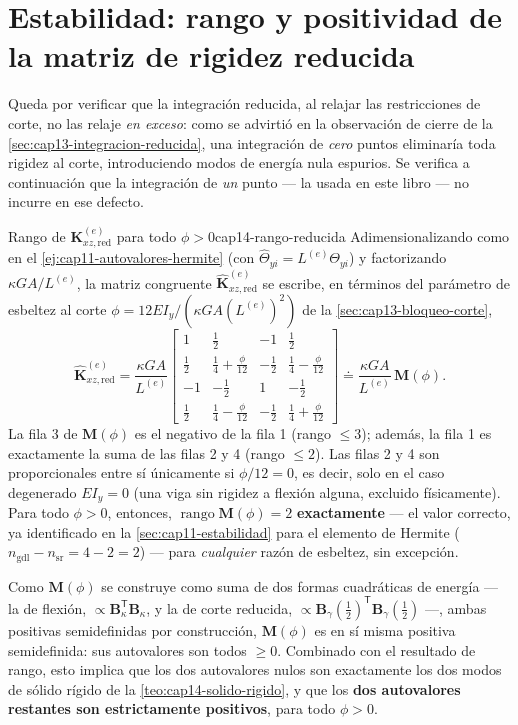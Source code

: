 \section{Estabilidad: rango y positividad de la matriz de rigidez reducida}
\label{sec:cap14-estabilidad}

Queda por verificar que la integración reducida, al relajar las restricciones de corte, no las relaje \emph{en exceso}: como se advirtió en la observación de cierre de la \cref{sec:cap13-integracion-reducida}, una integración de \emph{cero} puntos eliminaría toda rigidez al corte, introduciendo modos de energía nula espurios. Se verifica a continuación que la integración de \emph{un} punto --- la usada en este libro --- no incurre en ese defecto.

\begin{ejemplo}{Rango de \texorpdfstring{$\bm K^{(e)}_{xz,\text{red}}$}{K\_xz,red} para todo \texorpdfstring{$\phi>0$}{phi>0}}{cap14-rango-reducida}
Adimensionalizando como en el \cref{ej:cap11-autovalores-hermite} (con $\hat\Theta_{yi}=L^{(e)}\Theta_{yi}$) y factorizando $\kappa GA/L^{(e)}$, la matriz congruente $\hat{\bm K}^{(e)}_{xz,\text{red}}$ se escribe, en términos del parámetro de esbeltez al corte $\phi=12EI_y/(\kappa GA(L^{(e)})^2)$ de la \cref{sec:cap13-bloqueo-corte},
\[
\hat{\bm K}^{(e)}_{xz,\text{red}} = \frac{\kappa GA}{L^{(e)}}
\begin{bmatrix}
1 & \tfrac12 & -1 & \tfrac12 \\
\tfrac12 & \tfrac14+\tfrac{\phi}{12} & -\tfrac12 & \tfrac14-\tfrac{\phi}{12} \\
-1 & -\tfrac12 & 1 & -\tfrac12 \\
\tfrac12 & \tfrac14-\tfrac{\phi}{12} & -\tfrac12 & \tfrac14+\tfrac{\phi}{12}
\end{bmatrix} \doteq \frac{\kappa GA}{L^{(e)}}\,\bm M(\phi) .
\]
La fila 3 de $\bm M(\phi)$ es el negativo de la fila 1 (rango $\leq3$); además, la fila 1 es exactamente la suma de las filas 2 y 4 (rango $\leq2$). Las filas 2 y 4 son proporcionales entre sí únicamente si $\phi/12=0$, es decir, solo en el caso degenerado $EI_y=0$ (una viga sin rigidez a flexión alguna, excluido físicamente). Para todo $\phi>0$, entonces, $\operatorname{rango}\bm M(\phi)=2$ \textbf{exactamente} --- el valor correcto, ya identificado en la \cref{sec:cap11-estabilidad} para el elemento de Hermite ($n_{\text{gdl}}-n_{\text{sr}}=4-2=2$) --- para \emph{cualquier} razón de esbeltez, sin excepción.

Como $\bm M(\phi)$ se construye como suma de dos formas cuadráticas de energía --- la de flexión, $\propto\bm B_\kappa^{\mathsf T}\bm B_\kappa$, y la de corte reducida, $\propto\bm B_\gamma(\tfrac12)^{\mathsf T}\bm B_\gamma(\tfrac12)$ ---, ambas positivas semidefinidas por construcción, $\bm M(\phi)$ es en sí misma positiva semidefinida: sus autovalores son todos $\geq0$. Combinado con el resultado de rango, esto implica que los dos autovalores nulos son exactamente los dos modos de sólido rígido de la \cref{teo:cap14-solido-rigido}, y que los \textbf{dos autovalores restantes son estrictamente positivos}, para todo $\phi>0$.
\end{ejemplo}

